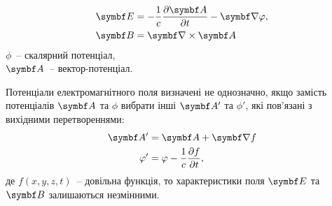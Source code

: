 \begin{align}
	\Efield &= -\frac{1}{c}\frac{\partial \vect{A}}{\partial t} - \vect{\nabla}\phi, \\
	 \Bfield &= \rot\vect{A}
\end{align}
$\phi$~-- скалярний потенціал,\\
$ \vect{A} $~-- вектор-потенціал.

Потенціали електромагнітного поля визначені не однозначно, якщо замість потенціалів $\vect{A}$ та $\phi$ вибрати інші $\vect{A}'$ та $\phi'$, які пов'язані з вихідними перетвореннями:
\begin{align}
	\vect{A}' & = \vect{A} +\vect{\nabla}f                      \\
	\phi'     & = \phi - \frac1c \frac{\partial f}{\partial t},
\end{align}
де  $f(x,y,z,t)$~-- довільна функція, то характеристики поля $\Efield$ та $\Bfield$ залишаються незмінними.


